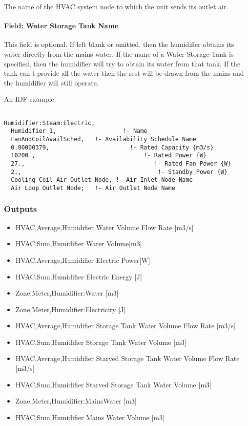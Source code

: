 The name of the HVAC system node to which the unit sends its outlet air.

\paragraph{Field: Water Storage Tank Name}\label{field-water-storage-tank-name}

This field is optional. If left blank or omitted, then the humidifier obtains its water directly from the mains water. If the name of a Water Storage Tank is specified, then the humidifier will try to obtain its water from that tank. If the tank can t provide all the water then the rest will be drawn from the mains and the humidifier will still operate.

An IDF example:

\begin{lstlisting}

Humidifier:Steam:Electric,
  Humidifier 1,                   !- Name
  FanAndCoilAvailSched,   !- Availability Schedule Name
  0.00000379,                       !- Rated Capacity {m3/s}
  10200.,                               !- Rated Power {W}
  27.,                                     !- Rated Fan Power {W}
  2.,                                       !- Standby Power {W}
  Cooling Coil Air Outlet Node, !- Air Inlet Node Name
  Air Loop Outlet Node;   !- Air Outlet Node Name
\end{lstlisting}

\subsubsection{Outputs}\label{outputs-016}

\begin{itemize}
\item
  HVAC,Average,Humidifier Water Volume Flow Rate {[}m3/s{]}
\item
  HVAC,Sum,Humidifier Water Volume{[}m3{]}
\item
  HVAC,Average,Humidifier Electric Power{[}W{]}
\item
  HVAC,Sum,Humidifier Electric Energy {[}J{]}
\item
  Zone,Meter,Humidifier:Water {[}m3{]}
\item
  Zone,Meter,Humidifier:Electricity {[}J{]}
\item
  HVAC,Average,Humidifier Storage Tank Water Volume Flow Rate {[}m3/s{]}
\item
  HVAC,Sum,Humidifier Storage Tank Water Volume {[}m3{]}
\item
  HVAC,Average,Humidifier Starved Storage Tank Water Volume Flow Rate {[}m3/s{]}
\item
  HVAC,Sum,Humidifier Starved Storage Tank Water Volume {[}m3{]}
\item
  Zone,Meter,Humidifier:MainsWater {[}m3{]}
\item
  HVAC,Sum,Humidifier Mains Water Volume {[}m3{]}
\end{itemize}

